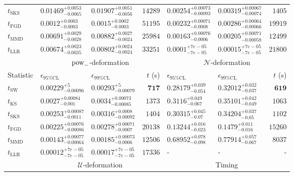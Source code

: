 \begin{tabular}{l|llr|llr}
	$t_{\mathrm{SKS}}$ & $0.01469_{-0.0065}^{+0.0053}$ & $0.01907_{-0.0056}^{+0.0051}$ & $14289$ & $0.00254_{-0.00093}^{+0.00073}$ & $0.00319_{-0.00074}^{+0.00067}$ & $1405$ \\
	$t_{\mathrm{FGD}}$ & ${\mathbf{0.0012_{-0.0003}^{+0.0003}}}$ & ${\mathbf{0.0015_{-0.0003}^{+0.0002}}}$ & $51195$ & $0.00232_{-0.0008}^{+0.00071}$ & $0.00286_{-0.00066}^{+0.00064}$ & $19919$ \\
	$t_{\mathrm{MMD}}$ & $0.00691_{-0.0028}^{+0.0029}$ & $0.00882_{-0.0024}^{+0.0027}$ & $25984$ & ${\mathbf{0.00163_{-0.0006}^{+0.00076}}}$ & ${\mathbf{0.00205_{-0.00058}^{+0.00071}}}$ & $12499$ \\
	$t_{\mathrm{LLR}}$ & $0.00674_{-0.0035}^{+0.0023}$ & $0.00802_{-0.0024}^{+0.0024}$ & $33251$ & $0.0001_{-7e-05}^{+7e-05}$ & $0.00015_{-7e-05}^{+7e-05}$ & $21800$ \\
	\toprule
	\multicolumn{1}{c}{} & \multicolumn{3}{c}{$\rm{pow}_{-}$-deformation} & \multicolumn{3}{c}{$\mathcal{N}$-deformation} \\
	Statistic & $\epsilon_{95\%\mathrm{CL}}$ & $\epsilon_{99\%\mathrm{CL}}$ & $t$ (s) & $\epsilon_{95\%\mathrm{CL}}$ & $\epsilon_{99\%\mathrm{CL}}$ & $t$ (s) \\
	\midrule
	$t_{\mathrm{SW}}$ & $0.00229_{-0.00096}^{+5}$ & $0.00293_{-0.00079}^{+5}$ & ${\mathbf{717}}$ & $0.28179_{-0.054}^{+0.039}$ & $0.32012_{-0.037}^{+0.032}$ & ${\mathbf{619}}$ \\
	$t_{\overline{\mathrm{KS}}}$ & $0.0027_{-0.001}^{+0.00084}$ & $0.0034_{-0.00085}^{+0.00073}$ & $1373$ & $0.3116_{-0.067}^{+0.049}$ & $0.35101_{-0.049}^{+0.042}$ & $1063$ \\
	$t_{\mathrm{SKS}}$ & $0.00253_{-0.0011}^{+0.00087}$ & $0.00316_{-0.00092}^{+0.0008}$ & $1404$ & $0.30315_{-0.07}^{+0.045}$ & $0.34204_{-0.05}^{+0.037}$ & $1102$ \\
	$t_{\mathrm{FGD}}$ & $0.00225_{-0.00086}^{+0.00076}$ & $0.00278_{-0.0007}^{+0.00071}$ & $20138$ & ${\mathbf{0.13244_{-0.023}^{+0.016}}}$ & ${\mathbf{0.1479_{-0.016}^{+0.011}}}$ & $15260$ \\
	$t_{\mathrm{MMD}}$ & ${\mathbf{0.00143_{-0.00064}^{+0.00077}}}$ & ${\mathbf{0.00185_{-0.0006}^{+0.00073}}}$ & $12506$ & $0.68952_{-0.098}^{+0.078}$ & $0.77914_{-0.067}^{+0.057}$ & $8037$ \\
	$t_{\mathrm{LLR}}$ & $0.00012_{-7e-05}^{+7e-05}$ & $0.00017_{-7e-05}^{+7e-05}$ & $17336$ & - & - & - \\
	\toprule
	\multicolumn{1}{c}{} & \multicolumn{3}{c}{$\mathcal{U}$-deformation} & \multicolumn{3}{c}{Timing} \\

\end{tabular}
